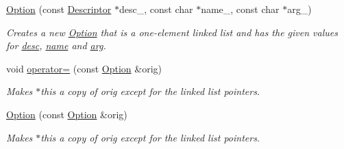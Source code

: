 \begin{DoxyCompactItemize}
\hyperlink{class_option_parser_1_1_option_ac8f3256f7544abfcdabd330671023e60}{Option} (const \hyperlink{struct_option_parser_1_1_descriptor}{Descriptor} $\ast$desc\-\_\-, const char $\ast$name\-\_\-, const char $\ast$arg\-\_\-)
\begin{DoxyCompactList}\small\item\em Creates a new \hyperlink{class_option_parser_1_1_option}{Option} that is a one-\/element linked list and has the given values for \hyperlink{class_option_parser_1_1_option_a9ea2f4b0658ab175b7f0f0c204671fa9}{desc}, \hyperlink{class_option_parser_1_1_option_abea386c9b8b1a810a2eb776d338fdfab}{name} and \hyperlink{class_option_parser_1_1_option_a5b222bff75241e025502aab20a914191}{arg}. \end{DoxyCompactList}\item 
void \hyperlink{class_option_parser_1_1_option_a79a809add651558e23bfcdccdad8bc24}{operator=} (const \hyperlink{class_option_parser_1_1_option}{Option} \&orig)
\begin{DoxyCompactList}\small\item\em Makes {\ttfamily $\ast$this} a copy of {\ttfamily orig} except for the linked list pointers. \end{DoxyCompactList}\item 
\hyperlink{class_option_parser_1_1_option_a7cb1067fedf60add2dad9c6bf9c78b4b}{Option} (const \hyperlink{class_option_parser_1_1_option}{Option} \&orig)
\begin{DoxyCompactList}\small\item\em Makes {\ttfamily $\ast$this} a copy of {\ttfamily orig} except for the linked list pointers. \end{DoxyCompactList}\end{DoxyCompactItemize}

